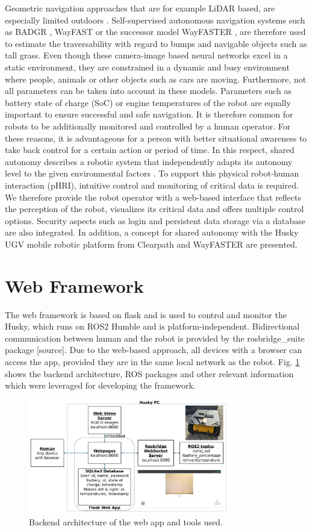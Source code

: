 \documentclass[letterpaper, 10 pt, conference]{ieeeconf}  %
\begin{document}
Geometric navigation approaches that are for example LiDAR based, are especially limited outdoors \cite{wayfast}.
Self-supervised autonomous navigation systems such as BADGR \cite{BADGR}, WayFAST \cite{wayfast} or the successor model WayFASTER \cite{wayfaster}, are therefore used to estimate the traversability with regard to bumps and navigable objects such as tall grass.
Even though these camera-image based neural networks excel in a static environment, they are constrained in a dynamic and busy environment where people, animals or other objects such as cars are moving.
Furthermore, not all parameters can be taken into account in these models. Parameters such as battery state of charge (SoC) or engine temperatures of the robot are equally important to ensure successful and safe navigation.
It is therefore common for robots to be additionally monitored and controlled by a human operator.
For these reasons, it is advantageous for a person with better situational awareness to take back control for a certain action or period of time. 
In this respect, shared autonomy describes a robotic system that independently adapts its autonomy level to the given environmental factors \cite{phri}. 
To support this physical robot-human interaction (pHRI), intuitive control and monitoring of critical data is required. 
We therefore provide the robot operator with a web-based interface that reflects the perception of the robot, visualizes its critical data and offers multiple control options. 
Security aspects such as login and persistent data storage via a database are also integrated. 
In addition, a concept for shared autonomy with the Husky UGV mobile robotic platform from Clearpath \cite{husky} and WayFASTER are presented. 

\section{Web Framework}

The web framework is based on flask and is used to control and monitor the Husky, which runs on ROS2 Humble and is platform-independent. 
Bidirectional communication between human and the robot is provided by the rosbridge\_suite package [source].   
Due to the web-based approach, all devices with a browser can access the app, provided they are in the same local network as the robot.
Fig. \ref{fig:userapp} shows the backend architecture, ROS packages and other relevant information which were leveraged for developing the framework.
\begin{figure}[b]
    \centerline{\includegraphics[width=8.9cm]{images/ROS_Web_App_Architecture.pdf}}
    \caption{Backend architecture of the web app and tools used.}
    \label{fig:userapp}
\end{figure}
\end{document}
